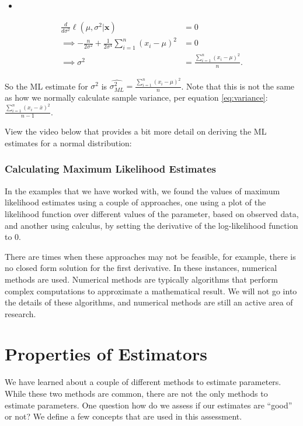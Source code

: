 \documentclass[
]{book}
\providecommand{\tightlist}{%
  \setlength{\itemsep}{0pt}\setlength{\parskip}{0pt}}
\begin{document}
\begin{itemize}
\tightlist
\item
\end{itemize}

\[
\begin{split}
\frac{d}{d \sigma^2}\ell (\mu, \sigma^2 | \boldsymbol{x}) &= 0 \\
\implies -\frac{n}{2 \sigma^2} + \frac{1}{2 \sigma^4} \sum_{i=1}^n (x_i - \mu)^2 &= 0 \\
\implies \sigma^2 &= \frac{\sum_{i=1}^n (x_i - \mu)^2}{n}.
\end{split}
\]

So the ML estimate for \(\sigma^2\) is \(\hat{\sigma_{ML}^2} = \frac{\sum_{i=1}^n (x_i - \mu)^2}{n}\). Note that this is not the same as how we normally calculate sample variance, per equation \eqref{eq:variance}: \(\frac{\sum_{i=1}^n (x_i-\bar{x})^2}{n-1}\).

View the video below that provides a bit more detail on deriving the ML estimates for a normal distribution:

\hypertarget{calculating-maximum-likelihood-estimates}{%
\subsubsection{Calculating Maximum Likelihood Estimates}\label{calculating-maximum-likelihood-estimates}}

In the examples that we have worked with, we found the values of maximum likelihood estimates using a couple of approaches, one using a plot of the likelihood function over different values of the parameter, based on observed data, and another using calculus, by setting the derivative of the log-likelihood function to 0.

There are times when these approaches may not be feasible, for example, there is no closed form solution for the first derivative. In these instances, numerical methods are used. Numerical methods are typically algorithms that perform complex computations to approximate a mathematical result. We will not go into the details of these algorithms, and numerical methods are still an active area of research.

\hypertarget{estprops}{%
\section{Properties of Estimators}\label{estprops}}

We have learned about a couple of different methods to estimate parameters. While these two methods are common, there are not the only methods to estimate parameters. One question how do we assess if our estimates are ``good'' or not? We define a few concepts that are used in this assessment.
\end{document}
